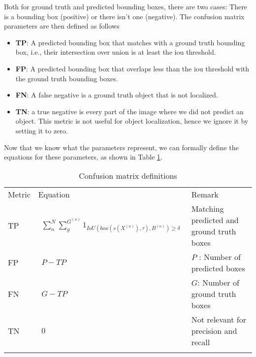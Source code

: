 Both for ground truth and predicted bounding boxes, there are two cases: There is a bounding box (positive) or there isn't one (negative). The confusion matrix parameters are then defined as follows
\begin{itemize}
    \item \textbf{TP}: A predicted bounding box that matches with a ground truth bounding box, i.e., their intersection over union is at least the \acrshort{iou} threshold.
    \item \textbf{FP}: A predicted bounding box that overlaps less than the \acrshort{iou} threshold with the ground truth bounding boxes.
    \item \textbf{FN}: A false negative is a ground truth object that is not localized. 
    \item \textbf{TN}: a true negative is every part of the image where we did not predict an object. This metric is not useful for object localization, hence we ignore it by setting it to zero.
\end{itemize}
Now that we know what the parameters represent, we can formally define the equations for these parameters, as shown in Table \ref{tab:confusion_matrix_definitions}.
\begin{table}[ht]
\centering
\begin{tabular}{lll}
  \toprule
  Metric & Equation & Remark\\
  \cmidrule(ll){1-3}
  \addlinespace[0.5em]
  TP & $\begin{aligned} \sum^{N}_{n} \sum^{G^{(n)}}_{g}  1_{IoU(box(s(X^{(n)}),\tau),B^{(n)})\ge\delta} \end{aligned}$ & Matching predicted and ground truth boxes \\
  \addlinespace[0.5em]
  FP & $\begin{aligned} P - TP \end{aligned}$ & $P$ : Number of predicted boxes \\
  \addlinespace[0.5em]
  FN & $\begin{aligned} G - TP \end{aligned}$ & $G$: Number of ground truth boxes \\
  \addlinespace[0.5em]
  TN & $\begin{aligned} 0 \end{aligned}$ & Not relevant for precision and recall\\
  \addlinespace[0.5em]
  \bottomrule 
\end{tabular}
\caption[Confusion matrix definitions]{Confusion matrix definitions}
\label{tab:confusion_matrix_definitions}
\end{table}

